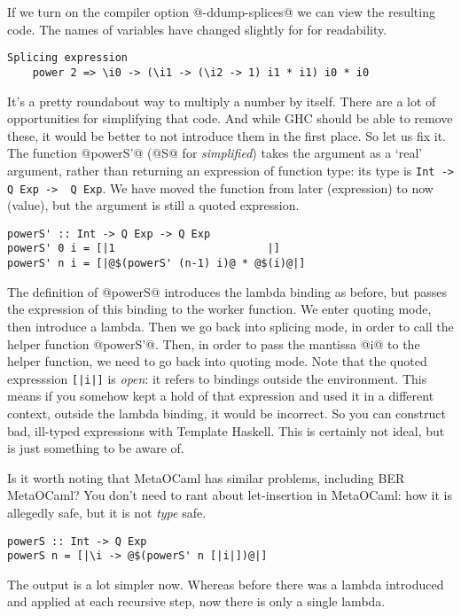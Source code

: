 If we turn on the compiler option @-ddump-splices@ we can view the resulting code.
The names of variables have changed slightly for for readability.

\begin{lstlisting}
Splicing expression
    power 2 => \i0 -> (\i1 -> (\i2 -> 1) i1 * i1) i0 * i0
\end{lstlisting}

It's a pretty roundabout way to multiply a number by itself. There are a lot of opportunities for simplifying that code. And while GHC should be able to remove these, it would be better to not introduce them in the first place.
So let us fix it.
The function @powerS'@ (@S@ for \emph{simplified}) takes the argument as a `real' argument, rather than returning an expression of function type: its type is \lstinline/Int ->  Q Exp ->  Q Exp/.
We have moved the function from later (expression) to now (value), but the argument is still a quoted expression.

\begin{lstlisting}
powerS' :: Int -> Q Exp -> Q Exp
powerS' 0 i = [|1                        |]
powerS' n i = [|@$(powerS' (n-1) i)@ * @$(i)@|]
\end{lstlisting}

The definition of @powerS@ introduces the lambda binding as before, but passes the expression of this binding to the worker function.
We enter quoting mode, then introduce a lambda. Then we go back into splicing mode, in order to call the helper function @powerS'@.
Then, in order to pass the mantissa @i@ to the helper function, we need to go back into quoting mode.
Note that the quoted expresssion \lstinline/[|i|]/ is \emph{open}: it refers to bindings outside the environment.
This means if you somehow kept a hold of that expression and used it in a different context, outside the lambda binding, it would be incorrect.
So you can construct bad, ill-typed expressions with Template Haskell. This is certainly not ideal, but is just something to be aware of.

Is it worth noting that MetaOCaml has similar problems, including BER MetaOCaml?
You don't need to rant about let-insertion in MetaOCaml: how it is allegedly safe, but it is not \emph{type} safe.

\begin{lstlisting}
powerS :: Int -> Q Exp
powerS n = [|\i -> @$(powerS' n [|i|])@|]
\end{lstlisting}

The output is a lot simpler now.
Whereas before there was a lambda introduced and applied at each recursive step, now there is only a single lambda.

